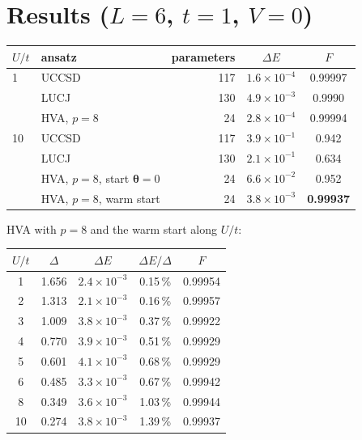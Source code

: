 \documentclass[11pt,a4paper]{article}
\begin{document}
\section{Results ($L = 6$, $t = 1$, $V = 0$)}

\begin{center}
\begin{tabular}{llrcc}
  \toprule
  $U/t$ & ansatz & parameters & $\Delta E$ & $F$ \\
  \midrule
  1  & UCCSD                         & 117 & $1.6\times10^{-4}$ & 0.99997 \\
     & LUCJ                          & 130 & $4.9\times10^{-3}$ & 0.9990 \\
     & HVA, $p = 8$                  &  24 & $2.8\times10^{-4}$ & 0.99994 \\
  \midrule
  10 & UCCSD                         & 117 & $3.9\times10^{-1}$ & 0.942 \\
     & LUCJ                          & 130 & $2.1\times10^{-1}$ & 0.634 \\
     & HVA, $p = 8$, start $\boldsymbol\theta = 0$ & 24 & $6.6\times10^{-2}$ & 0.952 \\
     & HVA, $p = 8$, warm start      &  24 & $3.8\times10^{-3}$ & \textbf{0.99937} \\
  \bottomrule
\end{tabular}
\end{center}

HVA with $p = 8$ and the warm start along $U/t$:
\begin{center}
\begin{tabular}{ccccc}
  \toprule
  $U/t$ & $\Delta$ & $\Delta E$ & $\Delta E/\Delta$ & $F$ \\
  \midrule
  1  & 1.656 & $2.4\times10^{-3}$ & 0.15\,\% & 0.99954 \\
  2  & 1.313 & $2.1\times10^{-3}$ & 0.16\,\% & 0.99957 \\
  3  & 1.009 & $3.8\times10^{-3}$ & 0.37\,\% & 0.99922 \\
  4  & 0.770 & $3.9\times10^{-3}$ & 0.51\,\% & 0.99929 \\
  5  & 0.601 & $4.1\times10^{-3}$ & 0.68\,\% & 0.99929 \\
  6  & 0.485 & $3.3\times10^{-3}$ & 0.67\,\% & 0.99942 \\
  8  & 0.349 & $3.6\times10^{-3}$ & 1.03\,\% & 0.99944 \\
  10 & 0.274 & $3.8\times10^{-3}$ & 1.39\,\% & 0.99937 \\
  \bottomrule
\end{tabular}
\end{center}
\end{document}
